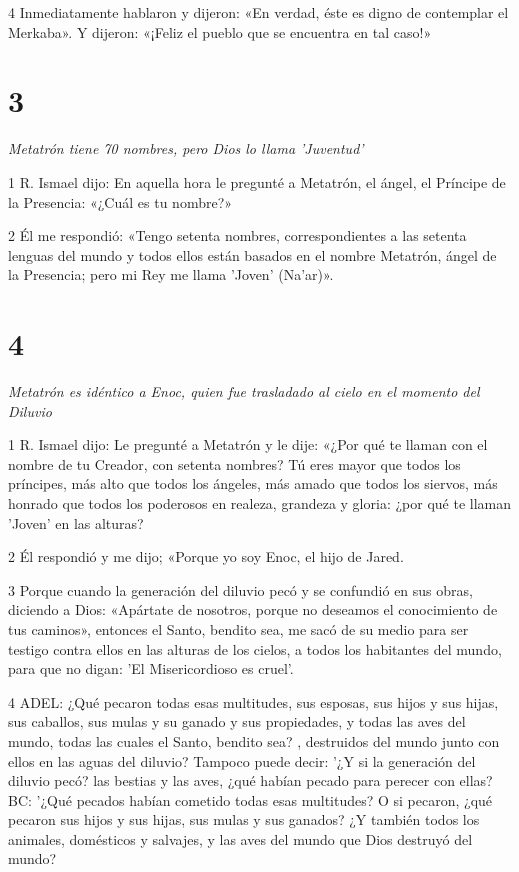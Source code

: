 \par 4 Inmediatamente hablaron y dijeron: «En verdad, éste es digno de contemplar el Merkaba». Y dijeron: «¡Feliz el pueblo que se encuentra en tal caso!»

\chapter{3}

\par \textit{Metatrón tiene 70 nombres, pero Dios lo llama 'Juventud'}

\par 1 R. Ismael dijo: En aquella hora le pregunté a Metatrón, el ángel, el Príncipe de la Presencia: «¿Cuál es tu nombre?»

\par 2 Él me respondió: «Tengo setenta nombres, correspondientes a las setenta lenguas del mundo y todos ellos están basados ​​en el nombre Metatrón, ángel de la Presencia; pero mi Rey me llama 'Joven' (Na'ar)».

\chapter{4}

\par \textit{Metatrón es idéntico a Enoc, quien fue trasladado al cielo en el momento del Diluvio}

\par 1 R. Ismael dijo: Le pregunté a Metatrón y le dije: «¿Por qué te llaman con el nombre de tu Creador, con setenta nombres? Tú eres mayor que todos los príncipes, más alto que todos los ángeles, más amado que todos los siervos, más honrado que todos los poderosos en realeza, grandeza y gloria: ¿por qué te llaman 'Joven' en las alturas?

\par 2 Él respondió y me dijo; «Porque yo soy Enoc, el hijo de Jared.

\par 3 Porque cuando la generación del diluvio pecó y se confundió en sus obras, diciendo a Dios: «Apártate de nosotros, porque no deseamos el conocimiento de tus caminos», entonces el Santo, bendito sea, me sacó de su medio para ser testigo contra ellos en las alturas de los cielos, a todos los habitantes del mundo, para que no digan: 'El Misericordioso es cruel'.

\par 4 ADEL: ¿Qué pecaron todas esas multitudes, sus esposas, sus hijos y sus hijas, sus caballos, sus mulas y su ganado y sus propiedades, y todas las aves del mundo, todas las cuales el Santo, bendito sea? , destruidos del mundo junto con ellos en las aguas del diluvio? Tampoco puede decir: '¿Y si la generación del diluvio pecó? las bestias y las aves, ¿qué habían pecado para perecer con ellas? BC: '¿Qué pecados habían cometido todas esas multitudes? O si pecaron, ¿qué pecaron sus hijos y sus hijas, sus mulas y sus ganados? ¿Y también todos los animales, domésticos y salvajes, y las aves del mundo que Dios destruyó del mundo?

